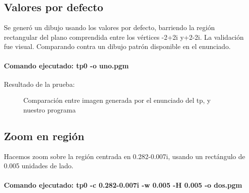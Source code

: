 \documentclass [12pt, a4paper]{article}
\begin{document}
	\subsection{Valores por defecto}
	Se generó un dibujo usando los valores por defecto, barriendo la región rectangular del plano comprendida entre los vértices -2+2i y+2-2i.	La validación fue visual. Comparando contra un dibujo patrón disponible en el enunciado.
	
	\paragraph{Comando ejecutado: tp0 -o uno.pgm }
	
	Resultado de la prueba:
	\begin{figure}[h]
		\centering
		\caption{Comparación entre imagen generada por el enunciado del tp, y nuestro programa}
		\label{f:comparacion1}
	\end{figure}
	\subsection{Zoom en región}
	Hacemos zoom sobre la región centrada en 0.282-0.007i, usando un
	rectángulo de 0.005 unidades de lado.
	
	\paragraph{Comando ejecutado: tp0 -c 0.282-0.007i -w 0.005 -H 0.005 -o dos.pgm}
	
\end{document}
